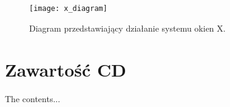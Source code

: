 \begin{appendices}
\begin{description}
\begin{figure}[H]
\begin{center}
    \texttt{[image: x\_diagram]}
\end{center}
\caption{Diagram przedstawiający działanie systemu okien X.}
\label{fig:}
\end{figure}

		
\end{description}



\section{Zawartość CD}

The contents...

\end{appendices}
